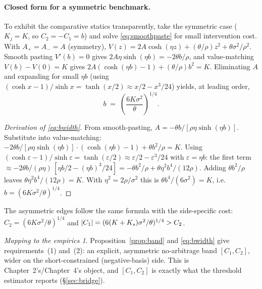\documentclass[11pt,a4paper]{article}
\DeclarePairedDelimiter{\abs}{\lvert}{\rvert}
\theoremstyle{plain}
\theoremstyle{definition}
\theoremstyle{remark}
\newtheorem*{takeaway}{Mapping to the empirics}
\begin{document}
\paragraph{Closed form for a symmetric benchmark.} To exhibit the comparative statics transparently, take the symmetric case ($K_j=K$, so $C_2=-C_1=b$) and solve \eqref{eq:smoothpaste} for small intervention cost. With $A_{+}=A_{-}=A$ (symmetry), $V(z)=2A\cosh(\eta z)+(\theta/\rho)z^2+\theta\sigma^2/\rho^2$. Smooth pasting $V'(b)=0$ gives $2A\eta\sinh(\eta b) = -2\theta b/\rho$, and value-matching $V(b)-V(0)=K$ gives $2A(\cosh(\eta b)-1)+(\theta/\rho)b^2=K$. Eliminating $A$ and expanding for small $\eta b$ (using $(\cosh x-1)/\sinh x=\tanh(x/2)\approx x/2 - x^3/24$) yields, at leading order,
\begin{equation}
\boxed{\; b \;=\; \left(\frac{6K\sigma^2}{\theta}\right)^{1/4}. \;} \label{eq:bwidth}
\end{equation}
\begin{proof}[Derivation of \eqref{eq:bwidth}]
From smooth-pasting, $A=-\theta b/[\rho\eta\sinh(\eta b)]$. Substitute into value-matching:
$-2\theta b/[\rho\eta\sinh(\eta b)]\cdot(\cosh(\eta b)-1)+\theta b^2/\rho=K$. Using $(\cosh\varepsilon-1)/\sinh\varepsilon=\tanh(\varepsilon/2)\approx \varepsilon/2-\varepsilon^3/24$ with $\varepsilon=\eta b$: the first term $\approx -2\theta b/(\rho\eta)\,[\eta b/2-(\eta b)^3/24]=-\theta b^2/\rho+\theta\eta^2 b^4/(12\rho)$. Adding $\theta b^2/\rho$ leaves $\theta\eta^2 b^4/(12\rho)=K$. With $\eta^2=2\rho/\sigma^2$ this is $\theta b^4/(6\sigma^2)=K$, i.e.\ $b=(6K\sigma^2/\theta)^{1/4}$.
\end{proof}
The asymmetric edges follow the same formula with the side-specific cost: $C_2=(6K\sigma^2/\theta)^{1/4}$ and $\abs{C_1}=(6(K+K_s)\sigma^2/\theta)^{1/4}>C_2$.

\begin{takeaway}
Proposition~\ref{prop:band} and \eqref{eq:bwidth} give requirements~(1) and~(2): an explicit, asymmetric no-arbitrage band $[C_1,C_2]$, wider on the short-constrained (negative-basis) side. This is Chapter~2's/Chapter~4's object, and $[C_1,C_2]$ is exactly what the threshold estimator reports (\S\ref{sec:bridge}).
\end{takeaway}
\end{document}
